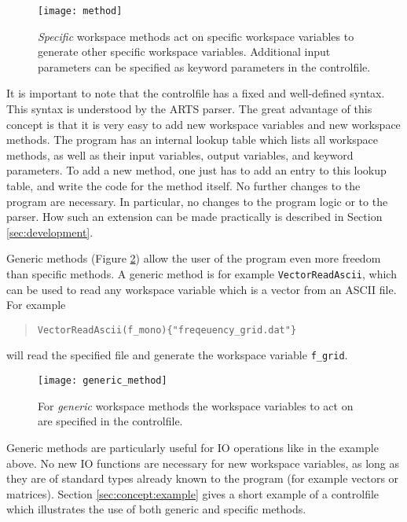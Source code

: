 \begin{figure}
  \begin{center}
    \texttt{[image: method]}
    \caption{\emph{Specific}
        workspace methods act on specific workspace variables to
        generate other specific workspace variables. Additional input
        parameters can be specified as keyword parameters in the
        controlfile.}
    \label{fig:method}
  \end{center}
\end{figure}

It is important to note that the controlfile has a fixed and
well-defined syntax. This syntax is understood by the ARTS parser.
The great advantage of this concept is that it is very easy to add
new workspace variables and new workspace methods. The program has
an internal lookup table which lists all workspace methods, as well
as their input variables, output variables, and keyword
parameters. To add a new method, one just has to add an entry to
this lookup table, and write the code for the method itself. No
further changes to the program are necessary. In particular, no
changes to the program logic or to the parser. How such an extension
can be made practically is described in Section \ref{sec:development}.


\label{sec:concept:generic}

Generic methods (Figure \ref{fig:generic_method}) allow the user of the
program even more freedom than specific methods. A generic method is
for example \verb|VectorReadAscii|, which can be used to read any
workspace variable which is a vector from an ASCII file. For example
\begin{quote}
  \verb|VectorReadAscii(f_mono){"freqeuency_grid.dat"}|
\end{quote}
will read the specified file and generate the workspace variable
\verb|f_grid|.

\begin{figure}
  \begin{center}
    \texttt{[image: generic\_method]}
    \caption{For \emph{generic}
      workspace methods the workspace variables to act on are
        specified in the controlfile.}
    \label{fig:generic_method}
  \end{center}
\end{figure}

Generic methods are particularly useful for IO operations like in the
example above. No new IO functions are necessary for new workspace
variables, as long as they are of standard types already known to the
program (for example vectors or matrices).  Section
\ref{sec:concept:example} gives a short example of a controlfile which
illustrates the use of both generic and specific methods.



